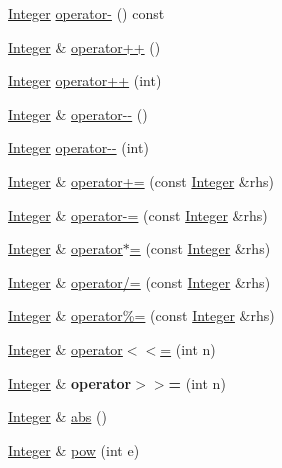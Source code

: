 \begin{DoxyCompactItemize}
\item 
\hyperlink{classInteger}{Integer} \hyperlink{classInteger_ae9d1fb575b55ac2f6352a2d735c4bb75}{operator-\/} () const 
\item 
\hyperlink{classInteger}{Integer} \& \hyperlink{classInteger_a3fc47ae07dce44aa72ce9e02b9a3e003}{operator++} ()
\item 
\hyperlink{classInteger}{Integer} \hyperlink{classInteger_a326d5bd7d72ad858f523bed95ae66150}{operator++} (int)
\item 
\hyperlink{classInteger}{Integer} \& \hyperlink{classInteger_ac6227ea2b4a75ff08d537db0d3a26be4}{operator-\/-\/} ()
\item 
\hyperlink{classInteger}{Integer} \hyperlink{classInteger_ae5b697679221dbf1fbc942335bb19fb4}{operator-\/-\/} (int)
\item 
\hyperlink{classInteger}{Integer} \& \hyperlink{classInteger_a0c37e366a26b17cfd73b1b29a1e8b47b}{operator+=} (const \hyperlink{classInteger}{Integer} \&rhs)
\item 
\hyperlink{classInteger}{Integer} \& \hyperlink{classInteger_a2bff1e6dc8f6990028783da8bdd89b0d}{operator-\/=} (const \hyperlink{classInteger}{Integer} \&rhs)
\item 
\hyperlink{classInteger}{Integer} \& \hyperlink{classInteger_acf1388dc4ce49c9b7d69b3b6c3a245f7}{operator$\ast$=} (const \hyperlink{classInteger}{Integer} \&rhs)
\item 
\hyperlink{classInteger}{Integer} \& \hyperlink{classInteger_aa13c715bbc68c58c2bd1f1b49a80277e}{operator/=} (const \hyperlink{classInteger}{Integer} \&rhs)
\item 
\hyperlink{classInteger}{Integer} \& \hyperlink{classInteger_a5af44fd8bef5e32fa720b1262045f1b7}{operator\%=} (const \hyperlink{classInteger}{Integer} \&rhs)
\item 
\hyperlink{classInteger}{Integer} \& \hyperlink{classInteger_a4114e69e0da713f50f9cf946cfc70637}{operator$<$$<$=} (int n)
\item 
\hypertarget{classInteger_a0fbada94834715ce6b91c39e5d41d24f}{\hyperlink{classInteger}{Integer} \& {\bfseries operator$>$$>$=} (int n)}\label{classInteger_a0fbada94834715ce6b91c39e5d41d24f}

\item 
\hyperlink{classInteger}{Integer} \& \hyperlink{classInteger_a28b38b99580e4787e353c6630c3cf063}{abs} ()
\item 
\hyperlink{classInteger}{Integer} \& \hyperlink{classInteger_aae56deca12053a28469749c93c9f7343}{pow} (int e)
\end{DoxyCompactItemize}
